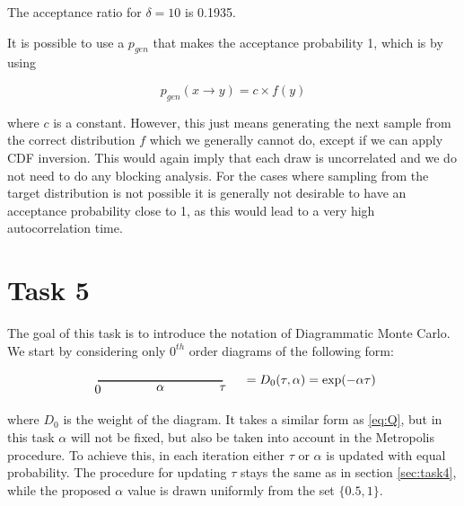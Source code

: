 \documentclass[a4paper, 11pt]{article}          %
\begin{document}
    The acceptance ratio for $\delta = 10$ is 0.1935.

    It is possible to use a $p_{gen}$ that makes the acceptance probability 1, which is by using

    \begin{equation*}
        p_{gen}(x \rightarrow y)= c \times f(y)
    \end{equation*}

    where $c$ is a constant. However, this just means generating the next sample from the correct distribution $f$ which we generally cannot do, except if we can apply CDF inversion. This would again imply that each draw is uncorrelated and we do not need to do any blocking analysis. For the cases where sampling from the target distribution is not possible it is generally not desirable to have an acceptance probability close to 1, as this would lead to a very high autocorrelation time.

    \section{Task 5}
    \label{sec:task-5}

    The goal of this task is to introduce the notation of Diagrammatic Monte Carlo. We start by considering only $0^{th}$ order diagrams of the following form:

    \begin{equation}
        \label{eq:0th_order_D}
        \begin{tikzpicture}[baseline=-0.5ex]
            \draw[thick] (0,0) -- (3.5,0);

            \node[below] at (0,0) {$0$};
            \node[below] at (1.75,0) {$\alpha$};
            \node[below] at (3.5,0) {$\tau$};
        \end{tikzpicture}
        \quad = D_0(\tau, \alpha) = \exp(-\alpha \tau)
    \end{equation}

    where $D_0$ is the weight of the diagram. It takes a similar form as \eqref{eq:Q}, but in this task $\alpha$ will not be fixed, but also be taken into account in the Metropolis procedure. To achieve this, in each iteration either $\tau$ or $\alpha$ is updated with equal probability. The procedure for updating $\tau$ stays the same as in section \ref{sec:task4}, while the proposed $\alpha$ value is drawn uniformly from the set $\{0.5,1\}$.
\end{document}
